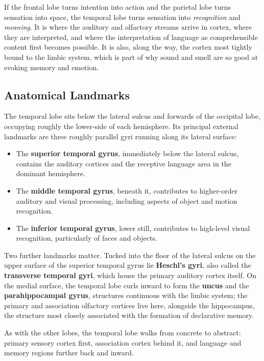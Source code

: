 \documentclass[11pt]{article}
\begin{document}
If the frontal lobe turns intention into action and the parietal lobe turns sensation into space, the temporal lobe turns sensation into \textit{recognition} and \textit{meaning}. It is where the auditory and olfactory streams arrive in cortex, where they are interpreted, and where the interpretation of language as comprehensible content first becomes possible. It is also, along the way, the cortex most tightly bound to the limbic system, which is part of why sound and smell are so good at evoking memory and emotion.

\subsection{Anatomical Landmarks}

The temporal lobe sits below the lateral sulcus and forwards of the occipital lobe, occupying roughly the lower-side of each hemisphere. Its principal external landmarks are three roughly parallel gyri running along its lateral surface:

\begin{itemize}
    \item The \textbf{superior temporal gyrus}, immediately below the lateral sulcus, contains the auditory cortices and the receptive language area in the dominant hemisphere.
    \item The \textbf{middle temporal gyrus}, beneath it, contributes to higher-order auditory and visual processing, including aspects of object and motion recognition.
    \item The \textbf{inferior temporal gyrus}, lower still, contributes to high-level visual recognition, particularly of faces and objects.
\end{itemize}

Two further landmarks matter. Tucked into the floor of the lateral sulcus on the upper surface of the superior temporal gyrus lie \textbf{Heschl's gyri}, also called the \textbf{transverse temporal gyri}, which house the primary auditory cortex itself. On the medial surface, the temporal lobe curls inward to form the \textbf{uncus} and the \textbf{parahippocampal gyrus}, structures continuous with the limbic system; the primary and association olfactory cortices live here, alongside the hippocampus, the structure most closely associated with the formation of declarative memory.

As with the other lobes, the temporal lobe walks from concrete to abstract: primary sensory cortex first, association cortex behind it, and language and memory regions further back and inward.
\end{document}
